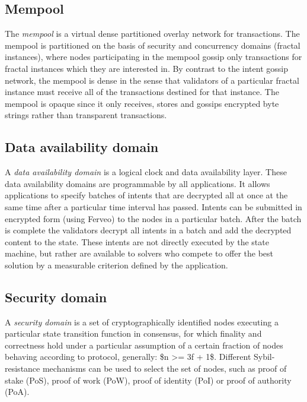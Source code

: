 \subsection{Mempool}\label{mempool}

The \emph{mempool} is a virtual dense partitioned overlay network for
transactions. The mempool is partitioned on the basis of security and
concurrency domains (fractal instances), where nodes participating in
the mempool gossip only transactions for fractal instances which they
are interested in. By contrast to the intent gossip network, the mempool
is dense in the sense that validators of a particular fractal instance
must receive all of the transactions destined for that instance. The
mempool is opaque since it only receives, stores and gossips encrypted
byte strings rather than transparent transactions.

\subsection{Data availability domain}\label{data-availability-domain}

A \emph{data availability domain} is a logical clock and data
availability layer. These data availability domains are programmable by
all applications. It allows applications to specify batches of intents
that are decrypted all at once at the same time after a particular time
interval has passed. Intents can be submitted in encrypted form (using
Ferveo) to the nodes in a particular batch. After the batch is complete
the validators decrypt all intents in a batch and add the decrypted
content to the state. These intents are not directly executed by the
state machine, but rather are available to solvers who compete to offer
the best solution by a measurable criterion defined by the application.

\subsection{Security domain}\label{security-domain}

A \emph{security domain} is a set of cryptographically identified nodes
executing a particular state transition function in consensus, for which
finality and correctness hold under a particular assumption of a certain
fraction of nodes behaving according to protocol, generally: \$n
\textgreater= 3f + 1\$. Different Sybil-resistance mechanisms can be
used to select the set of nodes, such as proof of stake (PoS), proof of
work (PoW), proof of identity (PoI) or proof of authority (PoA).

